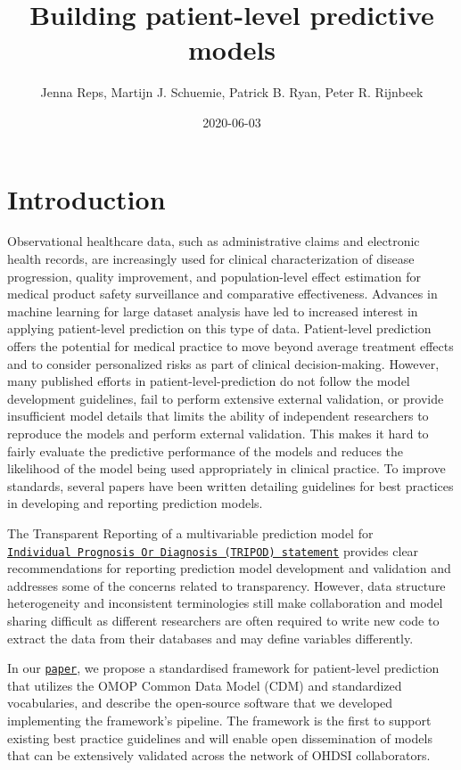 \documentclass[
]{article}
\title{Building patient-level predictive models}
\author{Jenna Reps, Martijn J. Schuemie, Patrick B. Ryan, Peter R. Rijnbeek}
\date{2020-06-03}
\begin{document}
\maketitle

{
\setcounter{tocdepth}{3}
\tableofcontents
}
\hypertarget{introduction}{%
\section{Introduction}\label{introduction}}

Observational healthcare data, such as administrative claims and
electronic health records, are increasingly used for clinical
characterization of disease progression, quality improvement, and
population-level effect estimation for medical product safety
surveillance and comparative effectiveness. Advances in machine learning
for large dataset analysis have led to increased interest in applying
patient-level prediction on this type of data. Patient-level prediction
offers the potential for medical practice to move beyond average
treatment effects and to consider personalized risks as part of clinical
decision-making. However, many published efforts in
patient-level-prediction do not follow the model development guidelines,
fail to perform extensive external validation, or provide insufficient
model details that limits the ability of independent researchers to
reproduce the models and perform external validation. This makes it hard
to fairly evaluate the predictive performance of the models and reduces
the likelihood of the model being used appropriately in clinical
practice. To improve standards, several papers have been written
detailing guidelines for best practices in developing and reporting
prediction models.

The Transparent Reporting of a multivariable prediction model for
\href{https://www.equator-network.org/reporting-guidelines/tripod-statement/}{\texttt{Individual\ Prognosis\ Or\ Diagnosis\ (TRIPOD)\ statement}}
provides clear recommendations for reporting prediction model
development and validation and addresses some of the concerns related to
transparency. However, data structure heterogeneity and inconsistent
terminologies still make collaboration and model sharing difficult as
different researchers are often required to write new code to extract
the data from their databases and may define variables differently.

In our
\href{https://academic.oup.com/jamia/article/25/8/969/4989437}{\texttt{paper}},
we propose a standardised framework for patient-level prediction that
utilizes the OMOP Common Data Model (CDM) and standardized vocabularies,
and describe the open-source software that we developed implementing the
framework's pipeline. The framework is the first to support existing
best practice guidelines and will enable open dissemination of models
that can be extensively validated across the network of OHDSI
collaborators.
\end{document}
